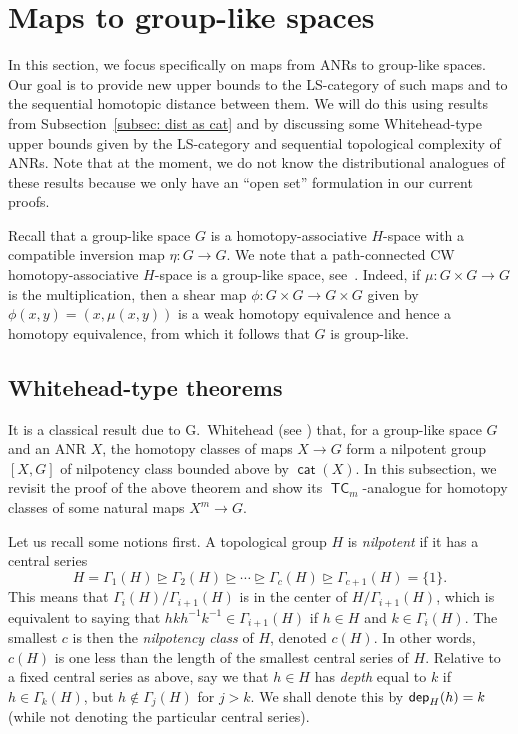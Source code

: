 \documentclass[amscd,amssymb,verbatim,10pt]{amsart}
\numberwithin{equation}{section}
\theoremstyle{plain}
\theoremstyle{definition}
\DeclareMathOperator{\cat}{{\mathsf{cat}}}
\DeclareMathOperator{\TC}{{\mathsf{TC}}}
\newcommand{\dep}{{\sf {dep}}}
\begin{document}
\section{Maps to group-like spaces}
In this section, we focus specifically on maps from ANRs to group-like spaces. Our goal is to provide new upper bounds to the LS-category of such maps and to the sequential homotopic distance between them. We will do this using results from Subsection~\ref{subsec: dist as cat} and by discussing some Whitehead-type upper bounds given by the LS-category and sequential topological complexity of ANRs. Note that at the moment, we do not know the distributional analogues of these results because we only have an ``open set'' formulation in our current proofs. 

Recall that a group-like space $G$ is a homotopy-associative $H$-space with a compatible inversion map $\eta\colon G\to G$. We note that a path-connected CW homotopy-associative $H$-space is a group-like space, see~\cite[Sections~III.4 \& X.2]{Wh}. Indeed, if $\mu\colon G\times G\to G$ is the multiplication, then a shear map $\phi\colon G\times G\to G\times G$ given by $\phi(x,y)=(x,\mu(x,y))$ is a weak homotopy equivalence and hence a homotopy equivalence, from which it follows that $G$ is group-like. 


\subsection{Whitehead-type theorems}\label{subsec: whitehead}

It is a classical result due to G.~Whitehead (see \cite[Chapter~X]{Wh})
that, for a group-like space $G$ and an ANR $X$, the homotopy classes of maps $X \to G$ form a nilpotent group $[X,G]$ of nilpotency class bounded above by $\cat(X)$. In this subsection, we revisit the proof of the above theorem and show its $\TC_m$-analogue for homotopy classes of some natural maps $X^m\to G$.

Let us recall some notions first. A topological group $H$ is \emph{nilpotent} if it has a central series
\[
H=\Gamma_1(H) \trianglerighteq \Gamma_2(H) \trianglerighteq \cdots \trianglerighteq \Gamma_c(H) \trianglerighteq \Gamma_{c+1}(H)=\{1\}.
\]
This means that $\Gamma_i(H)/\Gamma_{i+1}(H)$ is in the center of $H/\Gamma_{i+1}(H)$, which is equivalent to saying that $hkh^{-1}k^{-1} \in \Gamma_{i+1}(H)$ if $h\in H$ and $k \in \Gamma_i(H)$. The smallest $c$ is then the \emph{nilpotency class} of $H$, denoted $c(H)$. In other words, $c(H)$ is one less than the length of the smallest central series of $H$. 
Relative to a fixed central series as above, say we that $h\in H$ has \emph{depth} equal to $k$ if $h \in \Gamma_k(H)$, but $h \not\in \Gamma_j(H)$ for $j > k$. We shall denote this by $\dep_H(h)=k$ (while not denoting the particular central series). 
\end{document}
